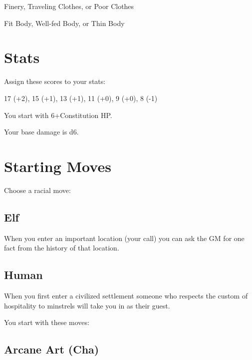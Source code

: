  

Finery, Traveling Clothes, or Poor Clothes

 

Fit Body, Well-fed Body, or Thin Body



 
\section{Stats}   
 



Assign these scores to your stats:

 

17 (+2), 15 (+1), 13 (+1), 11 (+0), 9 (+0), 8 (-1)

 

You start with 6+Constitution HP.



 

Your base damage is d6.

 
\section{Starting Moves}   
 


\startInstructionsAfterHeader
Choose a racial move:
\stopInstructionsAfterHeader
 


\subsection{Elf}   
 

When you enter an important location (your call) you can ask the GM for one fact from the history of that location.

 
\subsection{Human}   
 

When you first enter a civilized settlement someone who respects the custom of hospitality to minstrels will take you in as their guest.



 


\startInstructions
You start with these moves:
\stopInstructions
 
\subsection{Arcane Art (Cha)}     
 


